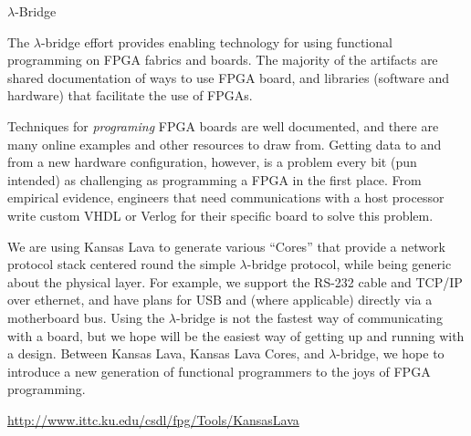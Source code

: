 \begin{hcarentry}{$\lambda$-Bridge}
\label{klava}
\makeheader

The $\lambda$-bridge effort provides enabling technology for using functional
programming on FPGA fabrics and boards. The majority of the artifacts are
shared documentation of ways to use FPGA board, and libraries (software and
hardware) that facilitate the use of FPGAs.

Techniques for {\em programing\/} FPGA boards are well documented, and there
are many online examples and other resources to draw from. Getting data to and
from a new hardware configuration, however, is a problem every bit (pun
intended) as challenging as programming a FPGA in the first place. From
empirical evidence, engineers that need communications with a host processor
write custom VHDL or Verlog for their specific board to solve this problem.

We are using Kansas Lava to generate various ``Cores'' that provide
a network protocol stack centered
round the simple $\lambda$-bridge protocol, while being generic
about the physical layer.
For example, we support the RS-232 cable and TCP/IP over ethernet, 
and have plans for USB and (where applicable) directly via a motherboard bus. Using the $\lambda$-bridge is not the fastest way of communicating
with a board, but we hope will be the easiest way of getting up and running
with a design.
Between Kansas Lava, Kansas Lava Cores, and $\lambda$-bridge, we hope
to introduce a new generation of functional programmers to the joys
of FPGA programming.

\FurtherReading
  \url{http://www.ittc.ku.edu/csdl/fpg/Tools/KansasLava}
\end{hcarentry}
